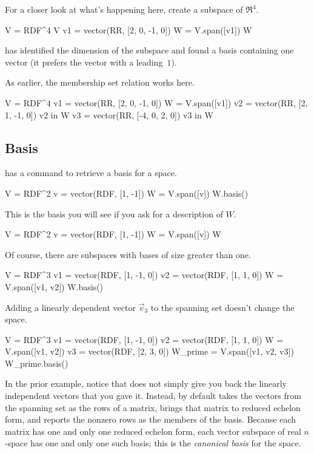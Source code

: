 For a closer look at what's happening here, create a subspace of $\Re^4$.
\begin{sageoutput}
V = RDF^4
V
v1 = vector(RR, [2, 0, -1, 0])
W = V.span([v1])
W
\end{sageoutput}
\Sage{} has identified the dimension of the subspace and found
a basis containing one vector (it prefers the vector with a leading~$1$).

As earlier, the membership set relation works here.
\begin{sageoutput}[d,0,3]
V = RDF^4
v1 = vector(RR, [2, 0, -1, 0])
W = V.span([v1])
v2 = vector(RR, [2, 1, -1, 0])
v2 in W
v3 = vector(RR, [-4, 0, 2, 0])
v3 in W
\end{sageoutput}



\subsection{Basis}
\Sage{} has a command to retrieve a basis for a space.
\begin{sageoutput}
V = RDF^2
v = vector(RDF, [1, -1])
W = V.span([v])     
W.basis()
\end{sageoutput}
\noindent
This is the basis you will see if you ask for a description of $W$.
\begin{sageoutput}[d,0,3]
V = RDF^2
v = vector(RDF, [1, -1])
W = V.span([v])     
W  
\end{sageoutput}

Of course, there are subspaces with bases of size greater than one.
\begin{sageoutput}
V = RDF^3               
v1 = vector(RDF, [1, -1, 0]) 
v2 = vector(RDF, [1, 1, 0]) 
W = V.span([v1, v2])       
W.basis()
\end{sageoutput}
Adding a linearly dependent vector $\vec{v}_3$ to the spanning
set doesn't change the space.
\begin{sageoutput}[d,0,3]
V = RDF^3               
v1 = vector(RDF, [1, -1, 0]) 
v2 = vector(RDF, [1, 1, 0]) 
W = V.span([v1, v2])       
v3 = vector(RDF, [2, 3, 0])
W_prime = V.span([v1, v2, v3])
W_prime.basis()
\end{sageoutput}

In the prior example, notice that \Sage{} does not simply
give you back the linearly independent
vectors that you gave it.
Instead, by default \Sage{} takes the vectors from the spanning set 
as the rows of a matrix,
brings that matrix to reduced echelon form, and reports the nonzero 
rows as the members of the basis.
Because each matrix has one and only one reduced echelon form, each 
vector subspace of real $n$-space has one and only one such
basis;
this is the \textit{canonical basis} for the space.

